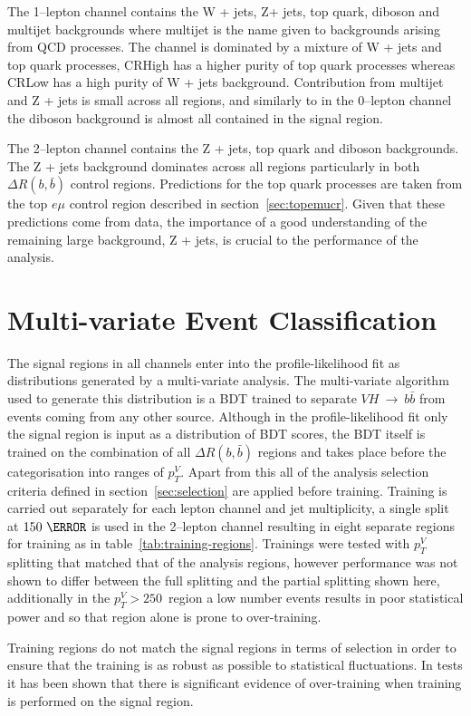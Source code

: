 The 1--lepton channel contains the W + jets, Z+ jets, top quark, diboson and multijet
backgrounds where multijet is the name given to backgrounds arising from QCD
processes. The channel is dominated by a mixture of W + jets and top quark
processes, CRHigh has a higher purity of top quark processes whereas CRLow has a
high purity of W + jets background. Contribution from multijet and Z + jets is
small across all regions, and similarly to in the 0--lepton channel the diboson
background is almost all contained in the signal region.

The 2--lepton channel contains the Z + jets, top quark and diboson backgrounds.
The Z + jets background dominates across all regions particularly in both
$\Delta R(b, \bar{b})$ control regions. Predictions for the top quark processes
are taken from the top $e \mu$ control region described in
section~\ref{sec:topemucr}. Given that these predictions come from data, the
importance of a good understanding of the remaining large background, Z + jets,
is crucial to the performance of the analysis.

\section{Multi-variate Event Classification}%
\label{sec:mva}

The signal regions in all channels enter into the profile-likelihood fit as
distributions generated by a multi-variate analysis. The multi-variate algorithm
used to generate this distribution is a BDT trained to separate
$VH~\rightarrow~b\bar{b}$ from events coming from any other source. Although in
the profile-likelihood fit only the signal region is input as a distribution of
BDT scores, the BDT itself is trained on the combination of all $\Delta R(b,
\bar{b})$ regions and takes place before the categorisation into ranges of
$p_T^V$. Apart from this all of the analysis selection criteria defined in
section~\ref{sec:selection} are applied before training. Training is carried out
separately for each lepton channel and jet multiplicity, a single split at
$150~\GeV$ is used in the 2--lepton channel resulting in eight separate regions
for training as in table~\ref{tab:training-regions}. Trainings were tested with
$p_T^V$ splitting that matched that of the analysis regions, however performance
was not shown to differ between the full splitting and the partial splitting
shown here, additionally in the $p_T^V > 250$~\GeV region a low number events
results in poor statistical power and so that region alone is prone to
over-training.

Training regions do not match the signal regions in terms of selection in order
to ensure that the training is as robust as possible to statistical
fluctuations. In tests it has been shown that there is significant evidence of
over-training when training is performed on the signal region.

